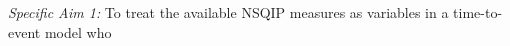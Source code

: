 \emph{Specific Aim 1:} To treat the available NSQIP measures as variables in a time-to-event model who